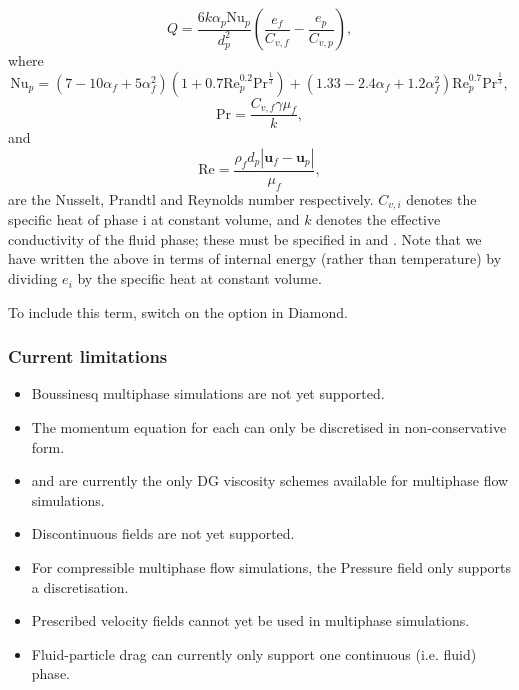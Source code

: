 \begin{equation}\label{eq:gunn_heat_transfer_term}
Q = \frac{6 k \alpha_p \mathrm{Nu}_p}{d_p^2}\left(\frac{e_f}{C_{v,f}} - \frac{e_p}{C_{v,p}}\right),
\end{equation}
where
\begin{equation}
\mathrm{Nu}_p = \left(7 - 10\alpha_f + 5\alpha_f^2\right)\left(1 + 0.7\mathrm{Re}_p^{0.2}\mathrm{Pr}^{\frac{1}{3}}\right) + \left(1.33 - 2.4\alpha_f + 1.2\alpha_f^2\right)\mathrm{Re}_p^{0.7}\mathrm{Pr}^{\frac{1}{3}},
\end{equation}
\begin{equation}
 \mathrm{Pr} = \frac{C_{v,f} \gamma \mu_f}{k},
\end{equation}
and
\begin{equation}
 \mathrm{Re} = \frac{\rho_f d_p |\mathbf{u}_f-\mathbf{u}_p|}{\mu_f},
\end{equation}
are the Nusselt, Prandtl and Reynolds number respectively. $C_{v,i}$ denotes the specific heat of phase i at constant volume, and $k$ denotes the effective conductivity of the fluid phase; these must be specified in  and . Note that we have written the above in terms of internal energy (rather than temperature) by dividing $e_i$ by the specific heat at constant volume.

To include this term, switch on the  option in Diamond.

\subsubsection{Current limitations}
\begin{itemize}
 \item Boussinesq multiphase simulations are not yet supported.
 \item The momentum equation for each  can only be discretised in non-conservative form.
 \item {} and  are currently the only DG viscosity schemes available for multiphase flow simulations.
 \item Discontinuous  fields are not yet supported.
 \item For compressible multiphase flow simulations, the Pressure field only supports a  discretisation.
 \item Prescribed velocity fields cannot yet be used in multiphase simulations.
 \item Fluid-particle drag can currently only support one continuous (i.e. fluid) phase.
\end{itemize}


